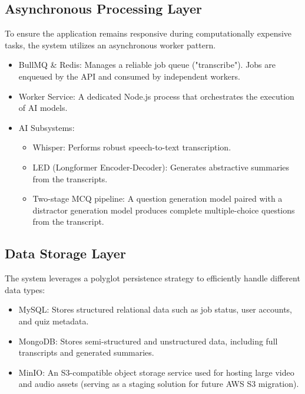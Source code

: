 \subsection{Asynchronous Processing Layer}
To ensure the application remains responsive during computationally expensive tasks, the system utilizes an asynchronous worker pattern.
\begin{itemize}
    \item BullMQ \& Redis: Manages a reliable job queue ("transcribe"). Jobs are enqueued by the API and consumed by independent workers.
    \item Worker Service: A dedicated Node.js process that orchestrates the execution of AI models.
    \item AI Subsystems:
        \begin{itemize}
            \item Whisper: Performs robust speech-to-text transcription.
            \item LED (Longformer Encoder-Decoder): Generates abstractive summaries from the transcripts.
            \item Two-stage MCQ pipeline: A question generation model paired with a distractor generation model produces complete multiple-choice questions from the transcript.
        \end{itemize}
\end{itemize}

\subsection{Data Storage Layer}
The system leverages a polyglot persistence strategy to efficiently handle different data types:
\begin{itemize}
    \item MySQL: Stores structured relational data such as job status, user accounts, and quiz metadata.
    \item MongoDB: Stores semi-structured and unstructured data, including full transcripts and generated summaries.
    \item MinIO: An S3-compatible object storage service used for hosting large video and audio assets (serving as a staging solution for future AWS S3 migration).
\end{itemize}
